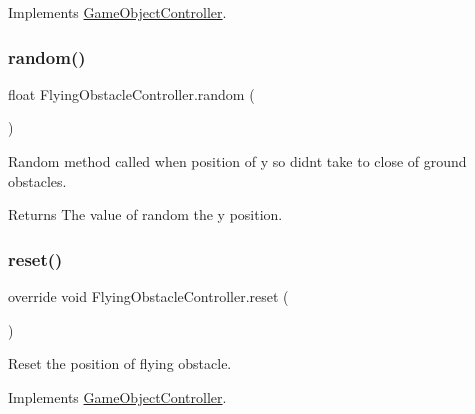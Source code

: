 Implements \hyperlink{class_game_object_controller_a0d186d143e280869efaff7835730fc82}{Game\+Object\+Controller}.

\hypertarget{class_flying_obstacle_controller_a18b0c286d961a4f8edb8abff1efd87f9}{}\label{class_flying_obstacle_controller_a18b0c286d961a4f8edb8abff1efd87f9} 
\subsubsection{\texorpdfstring{random()}{random()}}
{\footnotesize\ttfamily float Flying\+Obstacle\+Controller.\+random (\begin{DoxyParamCaption}{ }\end{DoxyParamCaption})\hspace{0.3cm}{\ttfamily [private]}}



Random method called when position of y so didn\textquotesingle{}t take to close of ground obstacles. 

\begin{DoxyReturn}{Returns}
The value of random the y position.
\end{DoxyReturn}
\hypertarget{class_flying_obstacle_controller_ab2b5e0c2f00348c159ded251e1ca61c0}{}\label{class_flying_obstacle_controller_ab2b5e0c2f00348c159ded251e1ca61c0} 
\subsubsection{\texorpdfstring{reset()}{reset()}}
{\footnotesize\ttfamily override void Flying\+Obstacle\+Controller.\+reset (\begin{DoxyParamCaption}{ }\end{DoxyParamCaption})\hspace{0.3cm}{\ttfamily [virtual]}}



Reset the position of flying obstacle. 



Implements \hyperlink{class_game_object_controller_a5e57dfd66120a1400e5947f5664a41e4}{Game\+Object\+Controller}.

\hypertarget{class_flying_obstacle_controller_a8da1b0b0f2acdd0b411d892740c39831}{}\label{class_flying_obstacle_controller_a8da1b0b0f2acdd0b411d892740c39831} 
